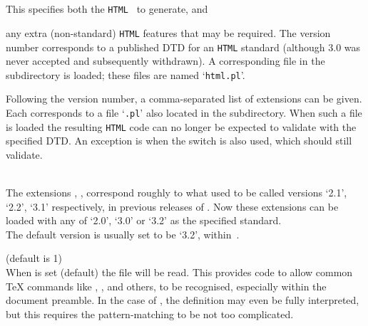 \begin{htmllist}%
%
%
%
\item [ -html\_version \texttt{(2.0|3.0|3.2)[,(math|i18n|table)]*}\label{cs_htmlversion}]
~\\\\
This specifies both the \texttt{HTML}~ to generate,
and\html{ \dots}%
\begin{changebar}
any extra (non-standard) \texttt{HTML} features that may be required.\html{\\}
The version number corresponds to a published DTD for an \texttt{HTML} standard
(although 3.0 was never accepted and subsequently withdrawn).
A corresponding \Perl{} file in the  subdirectory is loaded;
these files are named `\texttt{html}\texttt{.pl}'.

Following the version number, a comma-separated list of extensions
can be given. Each corresponds to a file `\texttt{.pl}'
also located in the  subdirectory.
When such a file is loaded the resulting \texttt{HTML} code
can no longer be expected to validate with the specified DTD.
An exception is  when the 
switch is also used, which should still validate.
\end{changebar}
\\
The extensions , , 
correspond roughly to what used to be called versions `2.1', `2.2', `3.1'
respectively, in previous releases of \latextohtml.
Now these extensions can be loaded with any of `2.0', `3.0' or `3.2'
as the specified standard.\\
The default version is usually set to be `3.2', within \,.%

%
%

\begin{changebar}%
\item [ -no\_tex\_defs\label{cs_notexdefs}]
 (default is 1)\\
When  is set (default) the file  will be read.
This provides code to allow common \TeX{} commands like , ,
 and others, to be recognised, especially within the document preamble.
In the case of , the definition may even be fully interpreted,
but this requires the pattern-matching to be not too complicated.


\end{changebar}
\end{htmllist}
